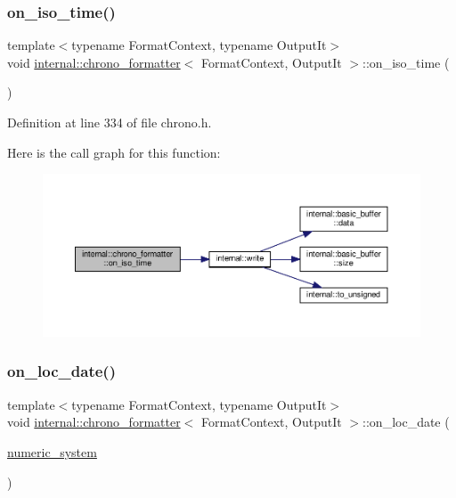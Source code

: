 \subsubsection{\texorpdfstring{on\+\_\+iso\+\_\+time()}{on\_iso\_time()}}
{\footnotesize\ttfamily template$<$typename Format\+Context, typename Output\+It$>$ \\
void \hyperlink{structinternal_1_1chrono__formatter}{internal\+::chrono\+\_\+formatter}$<$ Format\+Context, Output\+It $>$\+::on\+\_\+iso\+\_\+time (\begin{DoxyParamCaption}{ }\end{DoxyParamCaption})\hspace{0.3cm}{\ttfamily [inline]}}



Definition at line 334 of file chrono.\+h.

Here is the call graph for this function\+:
\nopagebreak
\begin{figure}[H]
\begin{center}
\leavevmode
\includegraphics[width=350pt]{structinternal_1_1chrono__formatter_a578e890af81d7ea6c4c3dcb64ba2e8e2_cgraph}
\end{center}
\end{figure}
\mbox{\label{structinternal_1_1chrono__formatter_adf05c0b171fec8af06faf4868bb4fbf0}} 
\subsubsection{\texorpdfstring{on\+\_\+loc\+\_\+date()}{on\_loc\_date()}}
{\footnotesize\ttfamily template$<$typename Format\+Context, typename Output\+It$>$ \\
void \hyperlink{structinternal_1_1chrono__formatter}{internal\+::chrono\+\_\+formatter}$<$ Format\+Context, Output\+It $>$\+::on\+\_\+loc\+\_\+date (\begin{DoxyParamCaption}\item[{\hyperlink{namespaceinternal_a16e2a1195ca0f5beab658685f71df86b}{numeric\+\_\+system}}]{ }\end{DoxyParamCaption})\hspace{0.3cm}{\ttfamily [inline]}}



